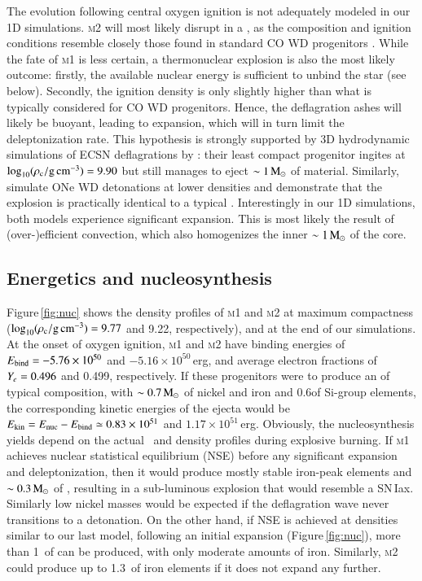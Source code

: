\documentclass[twocolumn]{aa}
\begin{document}
The evolution following central oxygen ignition is not adequately modeled in our 1D simulations. 
 \textsc{m2} will most likely disrupt in a \ia, as the composition and
 ignition conditions resemble closely those found in standard CO WD \ia
 progenitors \citep{Nomoto:1982zz}. While the fate of \textsc{m1} is less 
 certain, a thermonuclear explosion is also the most likely outcome: 
 firstly, the available nuclear energy is sufficient to unbind the star (see 
 below). Secondly, the ignition density is only slightly higher than  what is typically considered for CO WD \ia progenitors. 
 Hence, the deflagration ashes will likely be buoyant, leading to expansion, which will in turn limit the deleptonization rate. This hypothesis is strongly supported
 by 3D hydrodynamic  simulations of ECSN deflagrations by \cite{Jones:2016asr,Jones:2018ule}: their least compact progenitor ingites at $\log_{10} (\rho_{\mathrm{c}}/ \mathrm{g\,cm^{-3}})=9.90$ but still manages to eject  $\sim 1\mathrm{\,M_\odot}$ of material. 
 Similarly,  \cite{marquardt2015} simulate ONe WD detonations at lower 
 densities and demonstrate that the explosion is practically identical to a 
 typical \ia. 
 Interestingly in our 1D simulations, both models experience significant expansion. This is most likely the result of (over-)efficient convection, which also homogenizes the inner $\sim 1\mathrm{\,M_\odot}$ of the core. 
 
 
 
 

\subsection{Energetics and nucleosynthesis}\label{sec:3}
Figure\,\ref{fig:nuc} shows the density profiles of \textsc{m1} and \textsc{m2} at maximum compactness ($\log_{10} (\rho_{\mathrm{c}}/ \mathrm{g\,cm^{-3}})=9.77$ and 9.22, respectively), and at the end of our simulations. At the onset of oxygen ignition, \textsc{m1} and \textsc{m2} have binding energies of $E_{\rm bind}=-5.76\times10^{50}$ and $-5.16\times10^{50}$\,erg, and average electron fractions of $Y_e= 0.496$ and  0.499, respectively. If these progenitors were to produce an \ia of  typical composition, with $\sim 0.7\mathrm{\,M_\odot}$ of nickel and iron and 0.6\msun of Si-group elements, the corresponding kinetic energies of the ejecta would be $E_{\rm kin}=E_{\rm nuc}-E_{\rm bind}\simeq 0.83\times10^{51}$ and  $1.17\times10^{51}$\,erg. 
Obviously, the nucleosynthesis yields depend on the actual
\ye\ and density profiles during explosive burning. If 
\textsc{m1} achieves nuclear statistical equilibrium (NSE)
before any significant expansion and deleptonization, then it
would produce mostly stable iron-peak elements and $\sim 0.3\mathrm{\,M_\odot}$ of , resulting in a sub-luminous 
explosion that would resemble a SN\,Iax.  Similarly low nickel masses would be expected if the deflagration wave never transitions to a detonation. On the other hand, if NSE is achieved at densities similar to our last \mesa model, following an 
initial expansion (Figure\,\ref{fig:nuc}), more than 
1\msun\ of  can be produced, with only moderate
amounts of iron. Similarly, \textsc{m2} could produce up 
to 1.3\msun\ of iron elements if it does not expand any further. 
\end{document}
